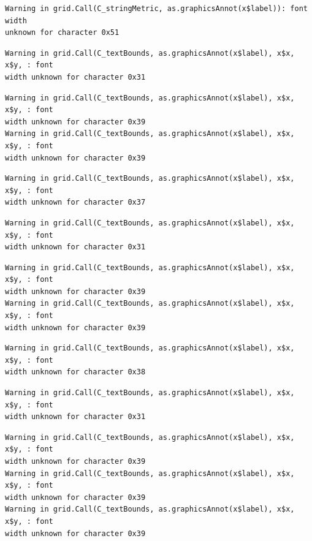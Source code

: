 \documentclass[
  letterpaper,
]{scrbook}
\begin{document}
\begin{verbatim}
Warning in grid.Call(C_stringMetric, as.graphicsAnnot(x$label)): font width
unknown for character 0x51
\end{verbatim}

\begin{verbatim}
Warning in grid.Call(C_textBounds, as.graphicsAnnot(x$label), x$x, x$y, : font
width unknown for character 0x31
\end{verbatim}

\begin{verbatim}
Warning in grid.Call(C_textBounds, as.graphicsAnnot(x$label), x$x, x$y, : font
width unknown for character 0x39
Warning in grid.Call(C_textBounds, as.graphicsAnnot(x$label), x$x, x$y, : font
width unknown for character 0x39
\end{verbatim}

\begin{verbatim}
Warning in grid.Call(C_textBounds, as.graphicsAnnot(x$label), x$x, x$y, : font
width unknown for character 0x37
\end{verbatim}

\begin{verbatim}
Warning in grid.Call(C_textBounds, as.graphicsAnnot(x$label), x$x, x$y, : font
width unknown for character 0x31
\end{verbatim}

\begin{verbatim}
Warning in grid.Call(C_textBounds, as.graphicsAnnot(x$label), x$x, x$y, : font
width unknown for character 0x39
Warning in grid.Call(C_textBounds, as.graphicsAnnot(x$label), x$x, x$y, : font
width unknown for character 0x39
\end{verbatim}

\begin{verbatim}
Warning in grid.Call(C_textBounds, as.graphicsAnnot(x$label), x$x, x$y, : font
width unknown for character 0x38
\end{verbatim}

\begin{verbatim}
Warning in grid.Call(C_textBounds, as.graphicsAnnot(x$label), x$x, x$y, : font
width unknown for character 0x31
\end{verbatim}

\begin{verbatim}
Warning in grid.Call(C_textBounds, as.graphicsAnnot(x$label), x$x, x$y, : font
width unknown for character 0x39
Warning in grid.Call(C_textBounds, as.graphicsAnnot(x$label), x$x, x$y, : font
width unknown for character 0x39
Warning in grid.Call(C_textBounds, as.graphicsAnnot(x$label), x$x, x$y, : font
width unknown for character 0x39
\end{verbatim}
\end{document}
